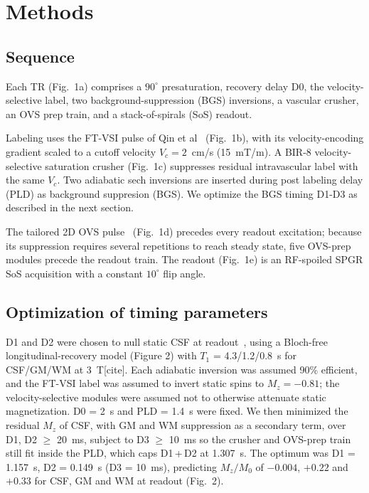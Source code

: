 \documentclass[12pt]{article}
\begin{document}
\section{Methods}
\subsection{Sequence}
Each TR (Fig.~1a) comprises a $90^\circ$ presaturation, recovery delay D0, 
the velocity-selective label, two background-suppression (BGS) inversions,
a vascular crusher, an OVS prep train, and a stack-of-spirals (SoS) readout.

Labeling uses the FT-VSI pulse of Qin et al~\cite{qin2016velocity}
(Fig.~1b), with its velocity-encoding gradient scaled
to a cutoff velocity $V_c=2$~cm/s (15~mT/m). 
A BIR-8 velocity-selective saturation crusher (Fig.~1c) 
suppresses residual intravascular label with the same $V_c$. 
Two adiabatic sech inversions are inserted during post labeling delay (PLD)
as background suppresion (BGS).
We optimize the BGS timing D1-D3 as described in the next section.

The tailored 2D OVS pulse~\cite{he2026improved} (Fig.~1d) precedes every readout
excitation; because its suppression requires several repetitions to reach steady
state, five OVS-prep modules precede the readout train. The readout (Fig.~1e) is an
RF-spoiled SPGR SoS acquisition with a constant $10^\circ$ flip angle.

\subsection{Optimization of timing parameters}
D1 and D2 were chosen to null static CSF at readout~\cite{hu2026csf}, 
using a Bloch-free longitudinal-recovery model (Figure 2)
with $T_1$ = 4.3/1.2/0.8~s for CSF/GM/WM at 3~T[cite]. 
Each adiabatic inversion was assumed 90\% efficient, and the
FT-VSI label was assumed to invert static spins to $M_z=-0.81$; 
the velocity-selective modules were assumed not to otherwise attenuate static magnetization. 
D0 = 2~s and PLD = 1.4~s were fixed. 
We then minimized the residual $M_z$ of CSF, 
with GM and WM suppression as a secondary term,
over D1, D2 $\geq$ 20~ms, 
subject to D3 $\geq$ 10~ms so
the crusher and OVS-prep train still fit inside the PLD, 
which caps D1\,+\,D2 at 1.307~s.
The optimum was D1 = 1.157~s, D2 = 0.149~s (D3 = 10~ms), 
predicting $M_z/M_0$ of
$-0.004$, $+0.22$ and $+0.33$ for CSF, GM and WM at readout (Fig.~2).
\end{document}
